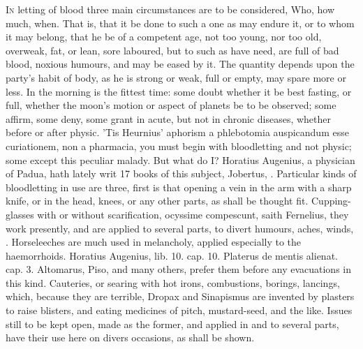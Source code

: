 {\lettrine[lines=3]{I}{n} letting of blood three main circumstances are to be considered,
 Who, how much, when. That is, that it be done to such a one as
may endure it, or to whom it may belong, that he be of a competent age,
not too young, nor too old, overweak, fat, or lean, sore laboured, but
to such as have need, are full of bad blood, noxious humours, and may
be eased by it.
The quantity depends upon the party's habit of body, as he is strong or
weak, full or empty, may spare more or less.
In the morning is the fittest time: some doubt whether it be best
fasting, or full, whether the moon's motion or aspect of planets be to
be observed; some affirm, some deny, some grant in acute, but not in
chronic diseases, whether before or after physic. 'Tis Heurnius'
aphorism a phlebotomia auspicandum esse curiationem, non a pharmacia,
you must begin with bloodletting and not physic; some except this
peculiar malady. But what do I? Horatius Augenius, a physician of
Padua, hath lately writ 17 books of this subject, Jobertus, \etc{}.
Particular kinds of bloodletting in use are three, first is that
opening a vein in the arm with a sharp knife, or in the head, knees, or
any other parts, as shall be thought fit.
Cupping-glasses with or without scarification, ocyssime compescunt,
saith Fernelius, they work presently, and are applied to several parts,
to divert humours, aches, winds, \etc{}.
Horseleeches are much used in melancholy, applied especially to the
haemorrhoids. Horatius Augenius, lib. 10. cap. 10. Platerus de mentis
alienat. cap. 3. Altomarus, Piso, and many others, prefer them before
any evacuations in this kind.
Cauteries, or searing with hot irons, combustions, borings,
lancings, which, because they are terrible, Dropax and Sinapismus are
invented by plasters to raise blisters, and eating medicines of pitch,
mustard-seed, and the like.
Issues still to be kept open, made as the former, and applied in and to
several parts, have their use here on divers occasions, as shall be
shown.
}
